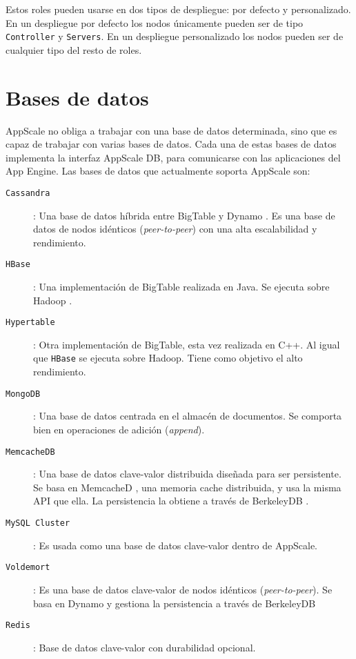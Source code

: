 Estos roles pueden usarse en dos tipos de despliegue: por defecto y personalizado. En un despliegue por defecto los nodos únicamente pueden ser de tipo \texttt{Controller} y \texttt{Servers}. En un despliegue personalizado los nodos pueden ser de cualquier tipo del resto de roles.


\section{Bases de datos}


AppScale no obliga a trabajar con una base de datos determinada, sino que es capaz de trabajar con varias bases de datos. Cada una de estas bases de datos implementa la interfaz AppScale DB, para comunicarse con las aplicaciones del App Engine. Las bases de datos que actualmente soporta AppScale son:

\begin{description}
\item[\texttt{Cassandra}] \cite{appscale-cassandra}: Una base de datos híbrida entre BigTable \cite{appscale-bigtable} y Dynamo \cite{appscale-dynamo}. Es una base de datos de nodos idénticos (\emph{peer-to-peer}) con una alta escalabilidad y rendimiento.
\item[\texttt{HBase}] \cite{appscale-hbase}: Una implementación de BigTable realizada en Java. Se ejecuta sobre Hadoop \cite{appscale-hadoop}.
\item[\texttt{Hypertable}] \cite{appscale-hypertable}: Otra implementación de BigTable, esta vez realizada en C++. Al igual que \texttt{HBase} se ejecuta sobre Hadoop. Tiene como objetivo el alto rendimiento.
\item[\texttt{MongoDB}] \cite{appscale-mongodb}: Una base de datos centrada en el almacén de documentos. Se comporta bien en operaciones de adición (\emph{append}).
\item[\texttt{MemcacheDB}] \cite{appscale-memcachedb}: Una base de datos clave-valor distribuida diseñada para ser persistente. Se basa en MemcacheD \cite{appscale-memcached}, una memoria cache distribuida, y usa la misma API que ella. La persistencia la obtiene a través de BerkeleyDB \cite{appscale-berkeleydb}.
\item[\texttt{MySQL Cluster}] \cite{appscale-mysql}: Es usada como una base de datos clave-valor dentro de AppScale.
\item[\texttt{Voldemort}] \cite{appscale-voldemort}: Es una base de datos clave-valor de nodos idénticos (\emph{peer-to-peer}). Se basa en Dynamo y gestiona la persistencia a través de BerkeleyDB
\item[\texttt{Redis}] \cite{appscale-redis}: Base de datos clave-valor con durabilidad opcional.
\end{description}

